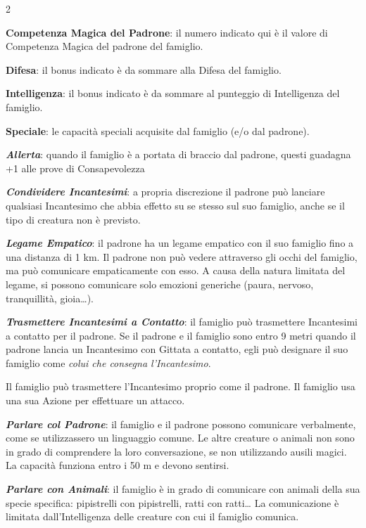 \begin{multicols}{2}

\medskip

\textbf{Competenza Magica del Padrone}: il numero indicato qui è il valore di Competenza Magica del padrone del famiglio.

\textbf{Difesa}: il bonus indicato è da sommare alla Difesa del famiglio.

\textbf{Intelligenza}: il bonus indicato è da sommare al punteggio di Intelligenza del famiglio.

\textbf{Speciale}: le capacità speciali acquisite dal famiglio (e/o dal padrone).

\emph{\textbf{Allerta}}: quando il famiglio è a portata di braccio dal padrone, questi guadagna +1 alle prove di Consapevolezza

\emph{\textbf{Condividere Incantesimi}}\label{Condividere Incantesimi}\hypertarget{Condividere Incantesimi}{}: a propria discrezione il padrone può lanciare qualsiasi Incantesimo che abbia effetto su se stesso sul suo famiglio, anche se il tipo di creatura non è previsto.

\emph{\textbf{Legame Empatico}}: il padrone ha un legame empatico con il suo famiglio fino a una distanza di 1 km. Il padrone non può vedere attraverso gli occhi del famiglio, ma può comunicare empaticamente con esso. A causa della natura limitata del legame, si possono comunicare solo emozioni generiche (paura, nervoso, tranquillità, gioia…).

\emph{\textbf{Trasmettere Incantesimi a Contatto}}\label{Trasmettere Incantesimi a Contatto}\hypertarget{Trasmettere Incantesimi a Contatto}{}: il famiglio può trasmettere Incantesimi a contatto per il padrone. Se il padrone e il famiglio sono entro 9 metri quando il padrone lancia un Incantesimo con Gittata a contatto, egli può designare il suo famiglio come \emph{colui che consegna l'Incantesimo}.

Il famiglio può trasmettere l'Incantesimo proprio come il padrone. Il famiglio usa una sua Azione per effettuare un attacco.

\emph{\textbf{Parlare col Padrone}}: il famiglio e il padrone possono comunicare verbalmente, come se utilizzassero un linguaggio comune. Le altre creature o animali non sono in grado di comprendere la loro conversazione, se non utilizzando ausili magici. La capacità funziona entro i 50 m e devono sentirsi.

\emph{\textbf{Parlare con Animali}}: il famiglio è in grado di comunicare con animali della sua specie specifica: pipistrelli con pipistrelli, ratti con ratti… La comunicazione è limitata dall'Intelligenza delle creature con cui il famiglio comunica.


\end{multicols}
